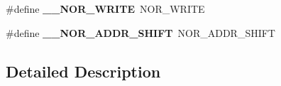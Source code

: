 \begin{DoxyCompactItemize}
\item 
\#define {\bfseries \+\_\+\+\_\+\+N\+O\+R\+\_\+\+W\+R\+I\+TE}~N\+O\+R\+\_\+\+W\+R\+I\+TE\hypertarget{group___h_a_l___n_o_r___aliased___defines_ga7b65a23e48189016e4f22ba4b84773ad}{}\label{group___h_a_l___n_o_r___aliased___defines_ga7b65a23e48189016e4f22ba4b84773ad}

\item 
\#define {\bfseries \+\_\+\+\_\+\+N\+O\+R\+\_\+\+A\+D\+D\+R\+\_\+\+S\+H\+I\+FT}~N\+O\+R\+\_\+\+A\+D\+D\+R\+\_\+\+S\+H\+I\+FT\hypertarget{group___h_a_l___n_o_r___aliased___defines_ga0fbcfd18de611ae4687a6bc41f427249}{}\label{group___h_a_l___n_o_r___aliased___defines_ga0fbcfd18de611ae4687a6bc41f427249}

\end{DoxyCompactItemize}


\subsection{Detailed Description}
